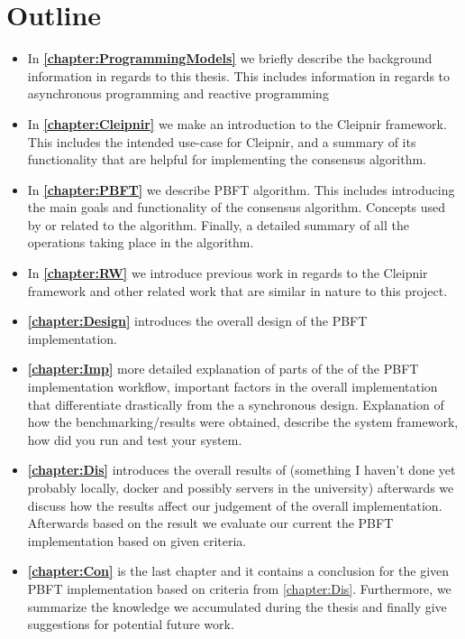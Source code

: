 \section{Outline}
\begin{itemize}
\item In \textbf{\autoref{chapter:ProgrammingModels}} we briefly describe the background information in regards to this thesis. This includes information in regards to asynchronous programming and reactive programming

\item In \textbf{\autoref{chapter:Cleipnir}} we make an introduction to the Cleipnir framework. This includes the intended use-case for Cleipnir, and a summary of its functionality that are helpful for implementing the consensus algorithm. 

\item In \textbf{\autoref{chapter:PBFT}} we describe PBFT algorithm. This includes introducing the main goals and functionality of the consensus algorithm. Concepts used by or related to the algorithm. Finally, a detailed summary of all the operations taking place in the algorithm.

\item In \textbf{\autoref{chapter:RW}} we introduce previous work in regards to the Cleipnir framework and other related work that are similar in nature to this project.

\item \textbf{\autoref{chapter:Design}} introduces the overall design of the PBFT implementation.

\item \textbf{\autoref{chapter:Imp}} more detailed explanation of parts of the of the PBFT implementation workflow, important factors in the overall implementation that differentiate drastically from the a synchronous design. Explanation of how the benchmarking/results were obtained, describe the system framework, how did you run and test your system.

\item \textbf{\autoref{chapter:Dis}} introduces the overall results of (something I haven't done yet probably locally, docker and possibly servers in the university) afterwards we discuss how the results affect our judgement of the overall implementation. Afterwards based on the result we evaluate our current the PBFT implementation based on given criteria.

\item \textbf{\autoref{chapter:Con}} is the last chapter and it contains a conclusion for the given PBFT implementation based on criteria from \autoref{chapter:Dis}. Furthermore, we summarize the knowledge we accumulated during the thesis and finally give suggestions for potential future work.
\end{itemize}